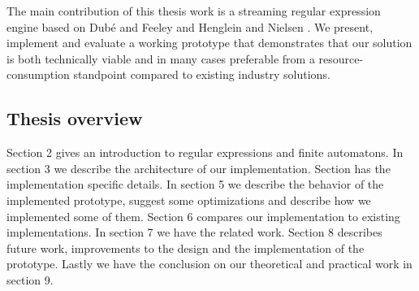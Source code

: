 The main contribution of this thesis work is a streaming regular
expression engine based on Dub\'{e} and Feeley \cite{Dube2000} and
Henglein and Nielsen \cite{Henglein2010}. We present, implement and
evaluate a working prototype that demonstrates that our solution is
both technically viable and in many cases preferable from a
resource-consumption standpoint compared to existing industry
solutions.

\subsection{Thesis overview}

Section 2 gives an introduction to regular expressions and finite
automatons. In section 3 we describe the architecture of our
implementation. Section has the implementation specific details. In
section 5 we describe the behavior of the implemented prototype,
suggest some optimizations and describe how we implemented some of
them. Section 6 compares our implementation to existing
implementations. In section 7 we have the related work. Section 8
describes future work, improvements to the design and the
implementation of the prototype. Lastly we have the conclusion on our
theoretical and practical work in section 9.

